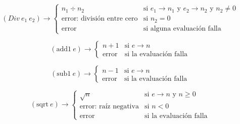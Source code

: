 \documentclass[12pt,letterpaper]{article}
\begin{document}
\[
(Div\ e_1\ e_2) \rightarrow \begin{cases} 
n_1 \div n_2 & \text{si } e_1 \rightarrow n_1 \text{ y } e_2 \rightarrow n_2 \text{ y } n_2 \neq 0 \\
\text{error: división entre cero} & \text{si } n_2 = 0 \\
\text{error} & \text{si alguna evaluación falla}
\end{cases}
\]

\[
(\text{add1}\ e) \rightarrow \begin{cases}
n + 1 & \text{si } e \rightarrow n \\
\text{error} & \text{si la evaluación falla}
\end{cases}
\]

\[
(\text{sub1}\ e) \rightarrow \begin{cases}
n - 1 & \text{si } e \rightarrow n \\
\text{error} & \text{si la evaluación falla}
\end{cases}
\]

\[
(\text{sqrt}\ e) \rightarrow \begin{cases}
\sqrt{n} & \text{si } e \rightarrow n \text{ y } n \geq 0 \\
\text{error: raíz negativa} & \text{si } n < 0 \\
\text{error} & \text{si la evaluación falla}
\end{cases}
\]
\end{document}
